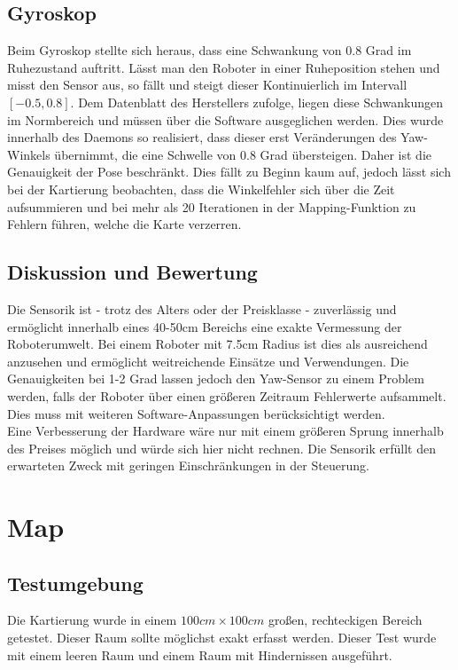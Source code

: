 \documentclass[twoside,12pt,a4paper]{report}
\begin{document}
	\subsection{Gyroskop}
	Beim Gyroskop stellte sich heraus, dass eine Schwankung von 0.8 Grad im Ruhezustand auftritt. Lässt man den Roboter in einer Ruheposition stehen und misst den Sensor aus, so fällt und steigt dieser Kontinuierlich im Intervall $[-0.5, 0.8]$. Dem Datenblatt des Herstellers zufolge, liegen diese Schwankungen im Normbereich und müssen über die Software ausgeglichen werden. Dies wurde innerhalb des Daemons so realisiert, dass dieser erst Veränderungen des Yaw-Winkels übernimmt, die eine Schwelle von 0.8 Grad übersteigen. Daher ist die Genauigkeit der Pose beschränkt. Dies fällt zu Beginn kaum auf, jedoch lässt sich bei der Kartierung beobachten, dass die Winkelfehler sich über die Zeit aufsummieren und bei mehr als 20 Iterationen in der Mapping-Funktion zu Fehlern führen, welche die Karte verzerren. \\
	
	\subsection{Diskussion und Bewertung}
	Die Sensorik ist - trotz des Alters oder der Preisklasse - zuverlässig und ermöglicht innerhalb eines 40-50cm Bereichs eine exakte Vermessung der Roboterumwelt. Bei einem Roboter mit 7.5cm Radius ist dies als ausreichend anzusehen und ermöglicht weitreichende Einsätze und Verwendungen. Die Genauigkeiten bei 1-2 Grad lassen jedoch den Yaw-Sensor zu einem Problem werden, falls der Roboter über einen größeren Zeitraum Fehlerwerte aufsammelt. Dies muss mit weiteren Software-Anpassungen berücksichtigt werden. \\
	Eine Verbesserung der Hardware wäre nur mit einem größeren Sprung innerhalb des Preises möglich und würde sich hier nicht rechnen. Die Sensorik erfüllt den erwarteten Zweck mit geringen Einschränkungen in der Steuerung. 
	
	\section{Map}
	\subsection{Testumgebung}
	Die Kartierung wurde in einem $100cm \times 100cm$ großen, rechteckigen Bereich getestet. Dieser Raum sollte möglichst exakt erfasst werden. Dieser Test wurde mit einem leeren Raum und einem Raum mit Hindernissen ausgeführt. 
	
\end{document}
